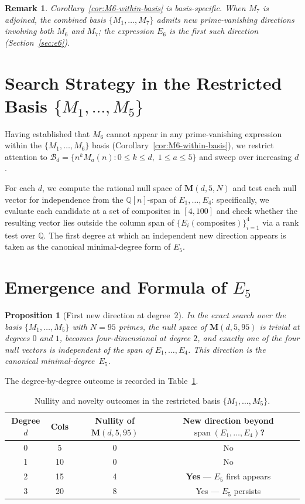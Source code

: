 \documentclass[11pt]{article}
\newtheorem{proposition}[theorem]{Proposition}
\newtheorem{remark}[theorem]{Remark}
\newcommand{\Q}{\mathbb{Q}}
\newcommand{\Span}{\operatorname{span}}
\begin{document}
\begin{remark}
Corollary~\ref{cor:M6-within-basis} is basis-specific.
When $M_7$ is adjoined, the combined basis $\{M_1,\dots,M_7\}$ admits new prime-vanishing
directions involving both $M_6$ and $M_7$; the expression $E_6$ is the first such direction
(Section~\ref{sec:e6}).
\end{remark}

\section{Search Strategy in the Restricted Basis $\{M_1,\dots,M_5\}$}
\label{sec:searchstrategy}

Having established that $M_6$ cannot appear in any prime-vanishing expression within the
$\{M_1,\dots,M_6\}$ basis (Corollary~\ref{cor:M6-within-basis}), we restrict attention to
$\mathcal{B}_d=\{n^k M_a(n):0\le k\le d,\; 1\le a\le 5\}$ and sweep over increasing $d$.

For each $d$, we compute the rational null space of $\mathbf{M}(d,5,N)$ and test each null
vector for independence from the $\Q[n]$-span of $E_1,\dots,E_4$: specifically, we evaluate
each candidate at a set of composites in $[4,100]$ and check whether the resulting vector
lies outside the column span of $\{E_i(\mathrm{composites})\}_{i=1}^{4}$ via a rank test
over $\Q$.
The first degree at which an independent new direction appears is taken as the canonical
minimal-degree form of $E_5$.

\section{Emergence and Formula of $E_5$}
\label{sec:e5}

\begin{proposition}[First new direction at degree~$2$]
\label{prop:E5-degree}
In the exact search over the basis $\{M_1,\dots,M_5\}$ with $N=95$ primes, the null space
of $\mathbf{M}(d,5,95)$ is trivial at degrees $0$ and $1$, becomes four-dimensional at
degree $2$, and exactly one of the four null vectors is independent of the span of
$E_1,\dots,E_4$.
This direction is the canonical minimal-degree~$E_5$.
\end{proposition}

The degree-by-degree outcome is recorded in Table~\ref{tab:nullity-m1-m5}.

\begin{table}[htbp]
\centering
\caption{Nullity and novelty outcomes in the restricted basis $\{M_1,\dots,M_5\}$.}
\label{tab:nullity-m1-m5}
\begin{tabular}{@{}cccc@{}}
\toprule
Degree $d$ & Cols & Nullity of $\mathbf{M}(d,5,95)$ & New direction beyond $\Span(E_1,\dots,E_4)$? \\
\midrule
0 & 5  & 0 & No \\
1 & 10 & 0 & No \\
2 & 15 & 4 & \textbf{Yes} — $E_5$ first appears \\
3 & 20 & 8 & Yes — $E_5$ persists \\
\bottomrule
\end{tabular}
\end{table}
\end{document}

